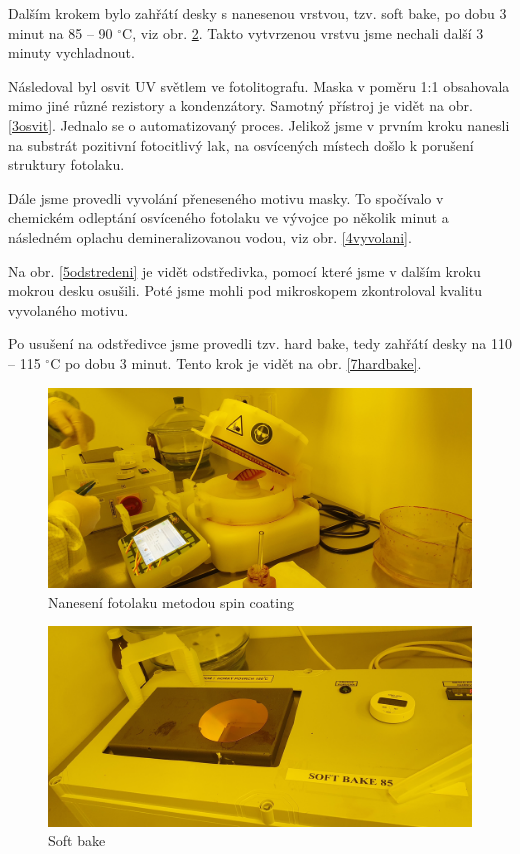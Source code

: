 \documentclass[a4paper,12pt]{article}
\begin{document}
Dalším krokem bylo zahřátí desky s nanesenou vrstvou, tzv. soft bake, po dobu 3 minut na 85 -- 90 $^{\circ}$C, viz obr. \ref{2bake}. Takto vytvrzenou vrstvu jsme nechali další 3 minuty vychladnout.

Následoval byl osvit UV světlem ve fotolitografu. Maska v poměru 1:1 obsahovala mimo jiné různé rezistory a kondenzátory. Samotný přístroj je vidět na obr. \ref{3osvit}. Jednalo se o automatizovaný proces. Jelikož jsme v prvním kroku nanesli na substrát pozitivní fotocitlivý lak, na osvícených místech došlo k porušení struktury fotolaku.

Dále jsme provedli vyvolání přeneseného motivu masky. To spočívalo v chemickém odleptání osvíceného fotolaku ve vývojce po několik minut a následném oplachu demineralizovanou vodou, viz obr. \ref{4vyvolani}. 

Na obr. \ref{5odstredeni} je vidět odstředivka, pomocí které jsme v dalším kroku mokrou desku osušili. Poté jsme mohli pod mikroskopem zkontroloval kvalitu vyvolaného motivu.

Po usušení na odstředivce jsme provedli tzv. hard bake, tedy zahřátí desky na 110 -- 115 $^{\circ}$C po dobu 3 minut. Tento krok je vidět na obr. \ref{7hardbake}.

\newpage
\begin{figure}[h!]
	\centering
	\includegraphics[width=130mm]{1spincoating.jpg}
	\caption{Nanesení fotolaku metodou spin coating}
	\label{1spincoating}
\end{figure}

\begin{figure}[h!]
	\centering
	\includegraphics[width=130mm]{2bake.jpg}
	\caption{Soft bake}
	\label{2bake}
\end{figure}
\end{document}
